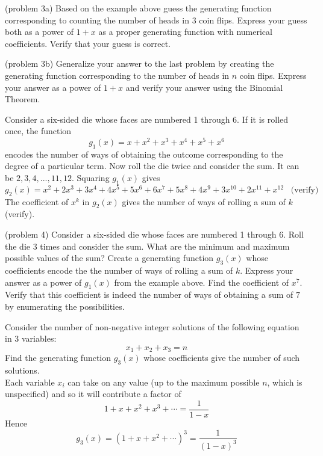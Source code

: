 \documentclass[handout]{ximera}
\begin{document}
\begin{problem}(problem 3a)
Based on the example above guess the generating function corresponding to counting the number of heads in 3 coin flips.
Express your guess both as a power of $1+x$ as a proper generating function with numerical coefficients.
Verify that your guess is correct. 
\end{problem}

\begin{problem}(problem 3b)
Generalize your answer to the last problem by creating the generating function corresponding to the 
number of heads in $n$ coin flips.
Express your answer as a power of $1+x$ and verify your answer using the Binomial Theorem.
\end{problem}
 

\begin{example}[example 4]
Consider a six-sided die whose faces are numbered 1 through 6. If it is rolled once, the function
\[
g_1(x) = x + x^2 + x^3 + x^4 + x^5 + x^6
\]
encodes the number of ways of obtaining the outcome corresponding to the degree of a particular term.
Now roll the die twice and consider the sum. It can be $2, 3, 4, ..., 11, 12$. Squaring $g_1(x)$ gives
\[
g_2(x) = x^2 + 2x^3 + 3x^4 + 4x^5 + 5x^6 + 6x^7 + 5x^8 + 4x^9+ 3x^{10} + 2x^{11} + x^{12} \;\;\; \text{(verify)}
\]
The coefficient of $x^k$ in $g_2(x)$ gives the number of ways of rolling a sum of $k$ (verify).
\end{example}

\begin{problem}(problem 4)
Consider a six-sided die whose faces are numbered 1 through 6. Roll the die 3 times and consider the sum.
What are the minimum and maximum possible values of the sum? Create a generating function $g_3(x)$ whose coefficients 
encode the the number of ways of rolling a sum of $k$.  Express your answer as a power of $g_1(x)$ from the example above.
Find the coefficient of $x^7$. Verify that this coefficient is 
indeed the number of ways of obtaining a sum of $7$ by enumerating the possibilities.
\end{problem}


\begin{example}[example 5]
Consider the number of non-negative integer solutions of the following equation in $3$ variables:
\[
x_1 + x_2 +  x_3 = n
\]
Find the generating function $g_3(x)$ whose coefficients give the number of such solutions.\\
Each variable $x_i$ can take on any value (up to the maximum possible $n$, which is unspecified) and so it will contribute 
a factor of 
\[
1 + x + x^2 +x^3 + \cdots = \frac{1}{1-x}
\]
Hence
\[
g_3(x) = (1+x+x^2 + \cdots)^3 = \frac{1}{(1-x)^3}
\]
\end{example}
\end{document}
